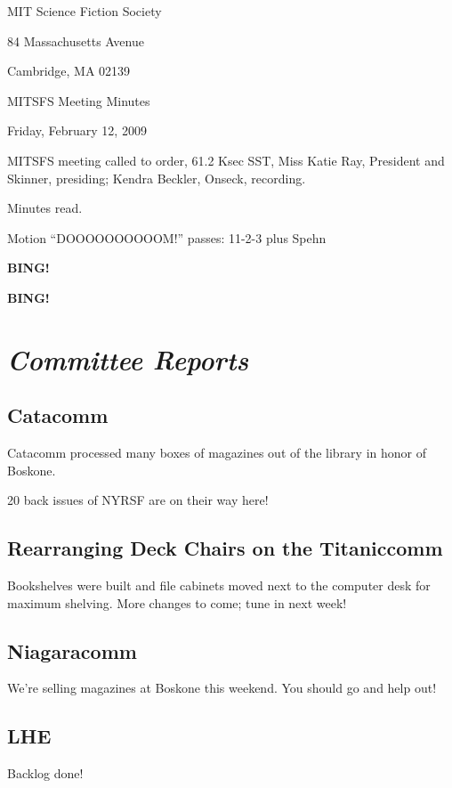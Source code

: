 \documentclass[10pt]{article}
\newcommand{\bing}{{\bf BING!} }
\newcommand{\goto}[1]{\bing \vskip 12pt \section*{{\em{#1}}}}
\newcommand{\ps}{ plus Spehn\xspace}
\newcommand{\skinner}{Miss Katie Ray, President and Skinner}
\newcommand{\onseck}{Kendra Beckler, Onseck}
\newcommand{\meetingdate}{Friday, February 12, 2009}
\begin{document}
\begin{center}

MIT Science Fiction Society

84 Massachusetts Avenue

Cambridge, MA 02139

\vspace{12pt}

MITSFS Meeting Minutes

\meetingdate

\end{center}

\vspace{18pt}

\setlength{\parskip}{6pt}

\noindent
MITSFS meeting called to order, 61.2 Ksec SST,
\skinner, presiding; \onseck, recording.

Minutes read.

Motion ``DOOOOOOOOOOM!'' passes: 11-2-3 \ps

\bing

\goto{Committee Reports}

\subsection*{Catacomm}

Catacomm processed many boxes of magazines out of the library in honor of 
Boskone.

20 back issues of NYRSF are on their way here!

\subsection*{Rearranging Deck Chairs on the Titaniccomm}

Bookshelves were built and file cabinets moved next to the computer desk for
maximum shelving.  More changes to come; tune in next week!

\subsection*{Niagaracomm}

We're selling magazines at Boskone this weekend.  You should go and help out!

\subsection*{LHE}

Backlog done!
\end{document}
